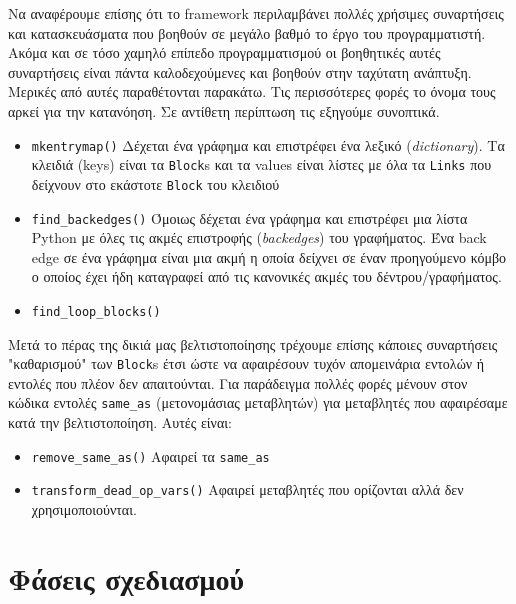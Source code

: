 Να αναφέρουμε επίσης ότι το framework περιλαμβάνει πολλές χρήσιμες συναρτήσεις
και κατασκευάσματα που βοηθούν σε μεγάλο βαθμό το έργο του προγραμματιστή. Ακόμα
και σε τόσο χαμηλό επίπεδο προγραμματισμού οι βοηθητικές αυτές συναρτήσεις είναι
πάντα καλοδεχούμενες και βοηθούν στην ταχύτατη ανάπτυξη. Μερικές από αυτές
παραθέτονται παρακάτω. Τις περισσότερες φορές το όνομα τους αρκεί για την
κατανόηση. Σε αντίθετη περίπτωση τις εξηγούμε συνοπτικά.

\begin{itemize}

\item \texttt{mkentrymap()} Δέχεται ένα γράφημα και επιστρέφει ένα λεξικό
(\textit{dictionary}). Τα κλειδιά (keys) είναι τα \texttt{Block}s και τα values
είναι λίστες με όλα τα \texttt{Links} που δείχνουν στο εκάστοτε \texttt{Block}
του κλειδιού

\item \texttt{find\_backedges()} Όμοιως δέχεται ένα γράφημα και επιστρέφει μια
λίστα Python με όλες τις ακμές επιστροφής (\textit{backedges}) του γραφήματος.
Ένα back edge σε ένα γράφημα είναι μια ακμή η οποία δείχνει σε έναν προηγούμενο
κόμβο ο οποίος έχει ήδη καταγραφεί από τις κανονικές ακμές του
δέντρου/γραφήματος.

\item \texttt{find\_loop\_blocks()}

\end{itemize}

Μετά το πέρας της δικιά μας βελτιστοποίησης τρέχουμε επίσης κάποιες συναρτήσεις
"καθαρισμού" των \texttt{Block}s έτσι ώστε να αφαιρέσουν τυχόν απομεινάρια
εντολών ή εντολές που πλέον δεν απαιτούνται. Για παράδειγμα πολλές φορές μένουν
στον κώδικα εντολές \texttt{same\_as} (μετονομάσιας μεταβλητών) για μεταβλητές
που αφαιρέσαμε κατά την βελτιστοποίηση. Αυτές είναι:

\begin{itemize}

\item \texttt{remove\_same\_as()} Αφαιρεί τα \texttt{same\_as}

\item \texttt{transform\_dead\_op\_vars()} Αφαιρεί μεταβλητές που ορίζονται αλλά
δεν χρησιμοποιούνται.

\end{itemize}


\section{Φάσεις σχεδιασμού}

